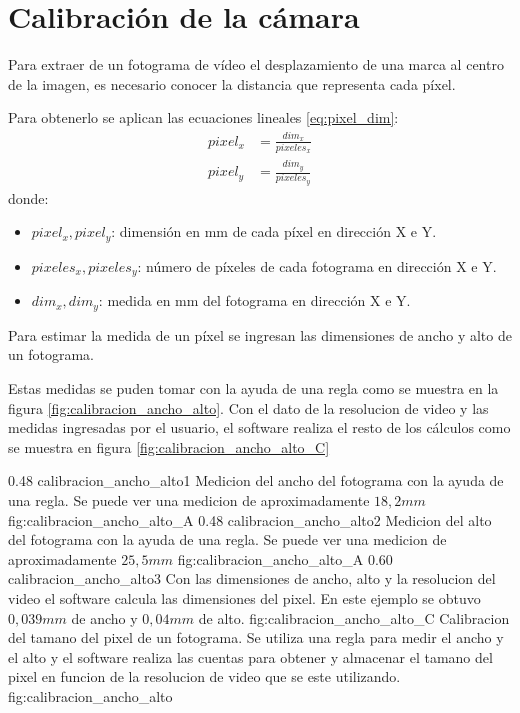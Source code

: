 \section{Calibración de la cámara} 
   Para extraer de un fotograma de vídeo el desplazamiento de una marca al centro de la imagen, es necesario conocer la distancia que representa cada píxel.\par
   Para obtenerlo se aplican las ecuaciones lineales \ref{eq:pixel_dim}:
   \begin{equation}
      \begin{aligned}
         pixel_x&=\frac{dim_x}{pixeles_x} \\
         pixel_y&=\frac{dim_y}{pixeles_y}
      \end{aligned}
      \label{eq:pixel_dim}
   \end{equation}
donde:
\begin{itemize}
   \item{$pixel_x,pixel_y$: dimensión en mm de cada píxel en dirección X e Y.}
   \item{$pixeles_x, pixeles_y$: número de píxeles de cada fotograma en dirección X e Y.}
   \item{$dim_x, dim_y$: medida en mm del fotograma en dirección X e Y.}
\end{itemize}

Para estimar la medida de un píxel se ingresan las dimensiones de ancho y alto de un fotograma. \par
Estas medidas se puden tomar con la ayuda de una regla como se muestra en la figura \ref{fig:calibracion_ancho_alto}.
Con el dato de la resolucion de video y las medidas ingresadas por el usuario, el software realiza el resto de los cálculos como se muestra en figura \ref{fig:calibracion_ancho_alto_C}

\subfigabc
   {0.48} {calibracion_ancho_alto1} {Medicion del ancho del fotograma con la ayuda de una regla. Se puede ver una medicion de aproximadamente $18,2mm$} {fig:calibracion_ancho_alto_A}
   {0.48} {calibracion_ancho_alto2} {Medicion del alto del fotograma con la ayuda de una regla. Se puede ver una medicion de aproximadamente $25,5mm$} {fig:calibracion_ancho_alto_A}
   {0.60} {calibracion_ancho_alto3} {Con las dimensiones de ancho, alto y la resolucion del video el software calcula las dimensiones del pixel. En este ejemplo se obtuvo $0,039mm$ de ancho y $0,04mm$ de alto.} {fig:calibracion_ancho_alto_C}
   {Calibracion del tamano del pixel de un fotograma. Se utiliza una regla para medir el ancho y el alto y el software realiza las cuentas para obtener y almacenar el tamano del pixel en funcion de la resolucion de video que se este utilizando.}
   {fig:calibracion_ancho_alto}


